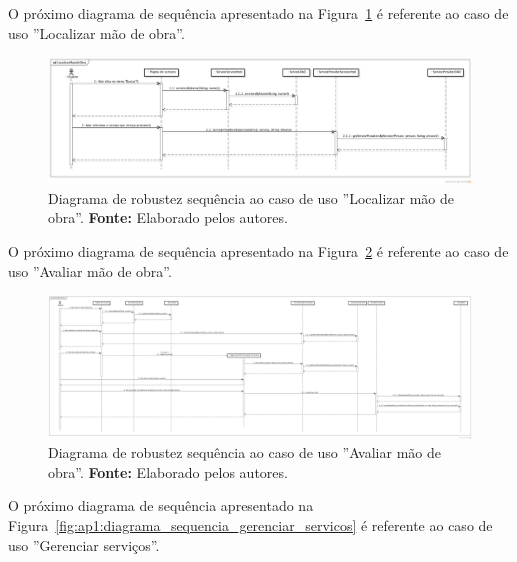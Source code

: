 \begin{landscape}
O próximo diagrama de sequência apresentado na Figura~\ref{fig:ap1:diagrama_sequencia_localizar_mao_de_obra} é referente ao caso de uso ''Localizar mão de obra''.

\newpage
\captionsetup[figure]{list=no}
\begin{figure}[h!]
	\centerline{\includegraphics[scale=0.4]{./imagens/apendices/diagrama-sequencia-localizar-mao-de-obra.png}}
	\caption[Diagrama de sequência referente ao caso de uso ''Localizar mão de obra''.]
	{Diagrama de robustez sequência ao caso de uso ''Localizar mão de obra''. \textbf{Fonte:} Elaborado pelos autores.}
	\label{fig:ap1:diagrama_sequencia_localizar_mao_de_obra}
\end{figure}

O próximo diagrama de sequência apresentado na Figura~\ref{fig:ap1:diagrama_sequencia_avaliar_mao_de_obra} é referente ao caso de uso ''Avaliar mão de obra''.

\newpage
\captionsetup[figure]{list=no}
\begin{figure}[h!]
	\centerline{\includegraphics[scale=0.2]{./imagens/apendices/diagrama-sequencia-avaliar-mao-de-obra.png}}
	\caption[Diagrama de sequência referente ao caso de uso ''Avaliar mão de obra''.]
	{Diagrama de robustez sequência ao caso de uso ''Avaliar mão de obra''. \textbf{Fonte:} Elaborado pelos autores.}
	\label{fig:ap1:diagrama_sequencia_avaliar_mao_de_obra}
\end{figure}

O próximo diagrama de sequência apresentado na Figura~\ref{fig:ap1:diagrama_sequencia_gerenciar_servicos} é referente ao caso de uso ''Gerenciar serviços''.


\end{landscape}

